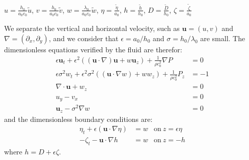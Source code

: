 \documentclass[11pt,a4paper]{article}
\begin{document}
\begin{center}
$ u = \displaystyle \frac{h_0}{a_0 c_0} \tilde{u}$, $ v = \displaystyle \frac{h_0}{a_0 c_0} \tilde{v}$, $ w = \displaystyle \frac{\lambda_0}{a_0 c_0} \tilde{w}$, $\displaystyle \eta = \frac{\tilde{\eta}}{a_0}$, $\displaystyle h = \frac{\tilde{h}}{h_0}$, $\displaystyle D = \frac{\tilde{D}}{h_0}$, $\displaystyle \zeta = \frac{\tilde{\zeta}}{a_0}$
\end{center}
We separate the vertical and horizontal velocity, such as $\mathbf{u} = (u,v)$ and $\nabla = (\partial_x,\partial_y)$, and we consider that $\epsilon = a_0 / h_0$ and $\sigma = h_0 / \lambda_0$ are small. The dimensionless equations verified by the fluid are therefor: 
\begin{align}
\displaystyle \epsilon \mathbf{u}_t + \epsilon^2((\mathbf{u} \cdot \nabla) \mathbf{u} + w \mathbf{u}_z) + \frac{1}{\rho c_0^2} \nabla P & = 0 \label{MConsxy}\\
\displaystyle \epsilon \sigma^2 w_t + \epsilon^2 \sigma^2 ((\mathbf{u} \cdot \nabla w) + w w_z) + \frac{1}{\rho c_0^2} P_z & = -1 \label{MConsz}\\
\nabla \cdot \mathbf{u} + w_z & =  0 \label{MassCons}\\
u_y-v_x & = 0 \label{Irrxy}\\
\mathbf{u}_z - \sigma^2 \nabla w & = 0 \label{Irrz}
\end{align}
and the dimensionless boundary conditions are: 
\begin{align}
\eta_t + \epsilon (\mathbf{u} \cdot \nabla \eta ) & = w & \mathrm{on} \: z = \epsilon \eta \label{BCH}\\
- \zeta_t - \mathbf{u} \cdot \nabla h & = w & \mathrm{on} \:  z = -h \label{BCB}
\end{align}
where $h = D + \epsilon \zeta $.
\end{document}
